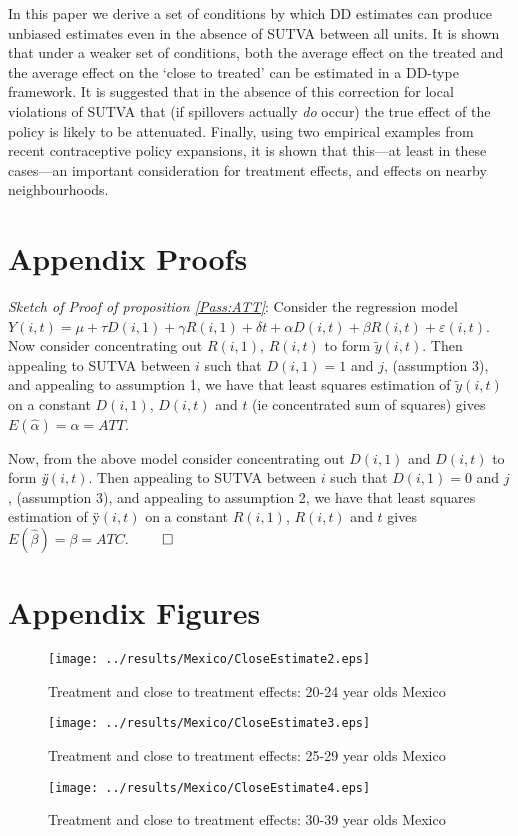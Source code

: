 \documentclass{article}
\begin{document}
\begin{spacing}{1.3}
In this paper we derive a set of conditions by which DD estimates can produce 
unbiased estimates even in the absence of SUTVA between all units.  It is shown
that under a weaker set of conditions, both the average effect on the treated
and the average effect on the `close to treated' can be estimated in a DD-type
framework.  It is suggested that in the absence of this correction for local 
violations of SUTVA that (if spillovers actually \emph{do} occur) the true 
effect of the policy is likely to be attenuated.  Finally, using two empirical 
examples from recent contraceptive policy expansions, it is shown that this---at
least in these cases---an important consideration for treatment effects, and
effects on nearby neighbourhoods.


\newpage

\newpage

\appendix
\section{Appendix Proofs}
\emph{Sketch of Proof of proposition \ref{Pass:ATT}}: Consider the regression 
model $Y(i,t)=\mu+\tau D(i,1) + \gamma R(i,1) + \delta t + \alpha D(i,t) + 
\beta R(i,t) + \varepsilon(i,t)$.  Now consider concentrating out $R(i,1)$, 
$R(i,t)$ to form $\tilde{y}(i,t)$.  Then appealing to SUTVA between $i$ such 
that $D(i,1)=1$ and $j$, (assumption 3), and appealing to assumption 1, we have 
that least squares estimation of $\tilde{y}(i,t)$ on a constant $D(i,1)$,
$D(i,t)$ and $t$ (ie concentrated sum of squares) gives
$E(\hat\alpha)=\alpha=ATT$.  


Now, from the above model consider concentrating out $D(i,1)$ and $D(i,t)$
to form \emph{\"{y}}$(i,t)$.  Then appealing to SUTVA between $i$ such 
that $D(i,1)=0$ and $j$, (assumption 3), and appealing to assumption 2, we 
have that least squares estimation of \"{y}$(i,t)$ on a constant $R(i,1)$,
$R(i,t)$ and $t$ gives $E(\hat\beta)=\beta=ATC$. $\qed$

\clearpage

\section{Appendix Figures}
\label{Sscn:Agraphs}
\begin{figure}[htpb!]
\texttt{[image: ../results/Mexico/CloseEstimate2.eps]}
\caption{Treatment and close to treatment effects: 20-24 year olds Mexico}
\end{figure}
\begin{figure}[htpb!]
\texttt{[image: ../results/Mexico/CloseEstimate3.eps]}
\caption{Treatment and close to treatment effects: 25-29 year olds Mexico}
\end{figure}
\begin{figure}[htpb!]
\texttt{[image: ../results/Mexico/CloseEstimate4.eps]}
\caption{Treatment and close to treatment effects: 30-39 year olds Mexico}
\end{figure}


\end{spacing}
\end{document}
